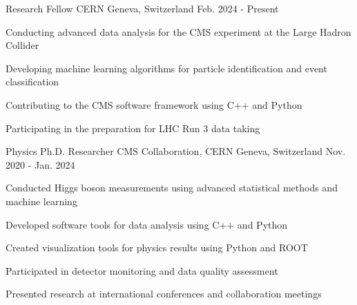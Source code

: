 


\begin{cventries}


\cventry
{Research Fellow} %
{CERN} %
{Geneva, Switzerland} %
{Feb. 2024 - Present} %
{ %
\begin{cvitems}
\item {Conducting advanced data analysis for the CMS experiment at the Large Hadron Collider}
\item {Developing machine learning algorithms for particle identification and event classification}
\item {Contributing to the CMS software framework using C++ and Python}
\item {Participating in the preparation for LHC Run 3 data taking}
\end{cvitems}
}


\cventry
{Physics Ph.D. Researcher} %
{CMS Collaboration, CERN} %
{Geneva, Switzerland} %
{Nov. 2020 - Jan. 2024} %
{ %
\begin{cvitems}
\item {Conducted Higgs boson measurements using advanced statistical methods and machine learning}
\item {Developed software tools for data analysis using C++ and Python}
\item {Created visualization tools for physics results using Python and ROOT}
\item {Participated in detector monitoring and data quality assessment}
\item {Presented research at international conferences and collaboration meetings}
\end{cvitems}
}



\end{cventries}
